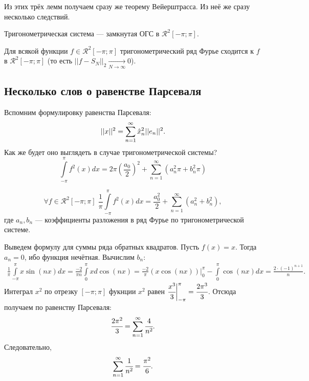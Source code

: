 Из этих трёх лемм получаем сразу же теорему Вейерштрасса. Из неё же сразу несколько следствий.
\begin{Consequence}
	Тригонометрическая система --- замкнутая ОГС в $\mathcal{R}^2[-\pi;\pi].$
\end{Consequence}
\begin{Consequence}
	Для всякой функции $f \in \mathcal{R}^2[-\pi;\pi]$ тригонометрический ряд Фурье сходится к $f$ в $\mathcal{R}^2[-\pi; \pi]$ (то есть $|| f - S_N||_2\underset{N \to \infty}{\longrightarrow} 0$).
\end{Consequence}
\subsection{Несколько слов о равенстве Парсеваля}
Вспомним формулировку равенства Парсеваля:
$$
	||x||^2 = \sum\limits_{n=1}^{\infty} \hat{x}_n^2 ||e_n||^2.
$$
Как же будет оно выглядеть в случае тригонометрической системы? 
$$\int\limits_{-\pi}^{\pi} f^2(x)dx =2\pi\left( \frac{a_0}{2}\right)^2 + \sum\limits_{n=1}^{\infty}(a_n^2\pi + b_n^2\pi)
$$
\begin{Consequence}
	$$
	\forall f \in \mathcal{R}^2[-\pi;\pi]\; \frac{1}{\pi} \int\limits_{-\pi}^{\pi} f^2(x)dx = \frac{a_0^2}{2} + \sum\limits_{n=1}^{\infty}(a_n^2 + b_n^2),
	$$ где $a_n, b_n$ --- коэффициенты разложения в ряд Фурье по тригонометрической системе.
\end{Consequence}
\begin{Examples}
	Выведем формулу для суммы ряда обратных квадратов. Пусть $f(x) = x$. Тогда $a_n = 0$, ибо функция нечётная. Вычислим $b_n$:
	\begin{gather*}
		\frac{1}{\pi} \int \limits_{-\pi}^{\pi} x \sin(nx)dx = \frac{-2}{\pi n} \int \limits_{0}^{\pi}x d\cos(nx) = \frac{-2}{\pi}\left(x \cos(nx)\right)\biggr|_0^{\pi} - \int \limits_{0}^{\pi}\cos(nx) dx = \frac{2\cdot(-1)^{n+1}}{n}.
	\end{gather*}
	Интеграл $x^2$ по отрезку $[-\pi;\pi]$ фукнции $x^2$ равен $\cfrac{x^3}{3}\biggr|_{-\pi}^{\pi} = \cfrac{2\pi^3}{3}$. Отсюда получаем по равенству Парсеваля:
    $$
		\cfrac{2\pi^2}{3} = \sum\limits_{n=1}^{\infty} \cfrac{4}{n^2}.
    $$
    Следовательно,
    $$
		\sum\limits_{n=1}^{\infty} \cfrac{1}{n^2} = \cfrac{\pi^2}{6}.
	$$
\end{Examples}
